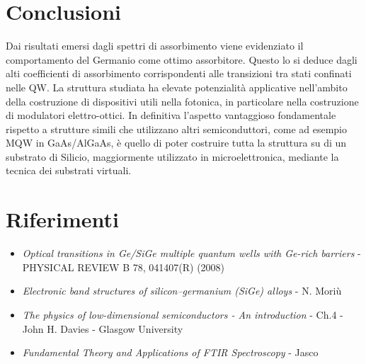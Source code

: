 \documentclass[journal]{IEEEtran}
\begin{document}
\section{Conclusioni}

Dai risultati emersi dagli spettri di assorbimento viene evidenziato il comportamento del Germanio come ottimo assorbitore. Questo lo si deduce dagli alti coefficienti di assorbimento corrispondenti alle transizioni tra stati confinati nelle QW. La struttura studiata ha elevate potenzialità applicative nell’ambito della costruzione di dispositivi utili nella fotonica, in particolare nella costruzione di modulatori elettro-ottici. In definitiva l’aspetto vantaggioso fondamentale rispetto a strutture simili che utilizzano altri semiconduttori, come ad esempio MQW in GaAs/AlGaAs, è quello di poter costruire tutta la struttura su di un substrato di Silicio, maggiormente utilizzato in microelettronica, mediante la tecnica dei substrati virtuali.

\section{Riferimenti}

\begin{itemize}
    \item \textit{Optical transitions in Ge/SiGe multiple quantum wells with Ge-rich barriers} - PHYSICAL REVIEW B 78, 041407(R) (2008)
    \item \textit{Electronic band structures of silicon–germanium (SiGe) alloys} - N. Moriù
    \item \textit{The physics of low-dimensional semiconductors - An introduction} - Ch.4 - John H. Davies - Glasgow University
    \item\textit{Fundamental Theory and Applications of FTIR Spectroscopy} - Jasco
\end{itemize}
\end{document}

